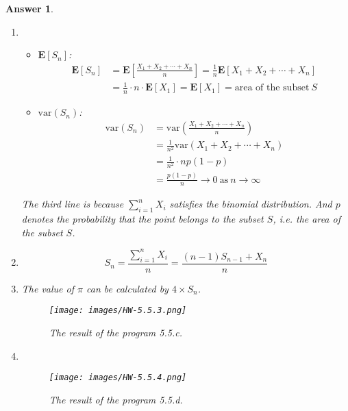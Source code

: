 \documentclass[utf8]{article}
\theoremstyle{definition}%
\theoremstyle{plain}%
\newtheorem{answer}{Answer} %
\begin{document}
\begin{answer} ~ 
    \begin{enumerate}[label=(\alph*)]
        \item \begin{itemize}
            \item $\mathbf{E}[S_n]$:
            \begin{equation}
            \begin{aligned}
                \mathbf{E}[S_n] &= \mathbf{E}\left[\frac{X_1 + X_2 + \cdots + X_n}{n}\right] = \frac{1}{n} \mathbf{E}[X_1 + X_2 + \cdots + X_n] \\ 
                &= \frac{1}{n} \cdot n \cdot \mathbf{E}[X_1] = \mathbf{E}[X_1] = \text{area of the subset}~S
            \end{aligned}
            \end{equation}
            \item $\text{var}(S_n)$:
            \begin{equation}
            \begin{aligned}
                \text{var}(S_n) &= \text{var}\left(\frac{X_1 + X_2 + \cdots + X_n}{n}\right) \\ 
                & = \frac{1}{n^2} \text{var}(X_1 + X_2 + \cdots + X_n) \\ 
                &= \frac{1}{n^2} \cdot np(1-p) \\ 
                &= \frac{p(1-p)}{n} \rightarrow 0 ~\text{as}~ n \rightarrow \infty
            \end{aligned}
            \end{equation}
        \end{itemize}    
        The third line is because $\sum_{i=1}^{n} X_i$ satisfies the binomial distribution. And $p$ denotes the probability that the point belongs to the subset $S$, i.e. the area of the subset $S$.
        \item \begin{equation}
                S_n = \frac{\sum_{i=1}^{n} X_i}{n} = \frac{(n-1)S_{n-1} + X_n}{n}
        \end{equation}
        \item The value of $\pi$ can be calculated by $4 \times S_n$.
        \begin{figure}[H]
            \centering
            \texttt{[image: images/HW-5.5.3.png]}
            \caption{The result of the program 5.5.c.}
        \end{figure}
        \item ~
        \begin{figure}[H]
            \centering
            \texttt{[image: images/HW-5.5.4.png]}
            \caption{The result of the program 5.5.d.}
        \end{figure}
    \end{enumerate}
\end{answer}
\end{document}
